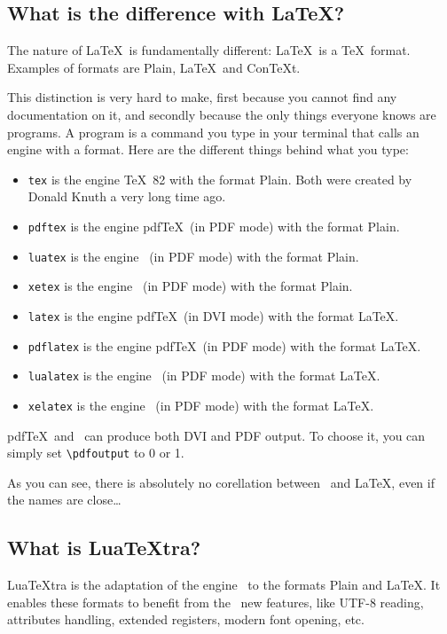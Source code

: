 \documentclass{article}
\newcommand\code{\texttt}
\begin{document}
\subsection{What is the difference with \LaTeX ?}

The nature of \LaTeX\ is fundamentally different: \LaTeX\ is a \TeX\ format.
Examples of formats are Plain, \LaTeX\ and Con\TeX t.

This distinction is very hard to make, first because you cannot find any
documentation on it, and secondly because the only things everyone knows are
programs. A program is a command you type in your terminal that calls an
engine with a format. Here are the different things behind what you type:

\begin{itemize}
  \item \code{tex} is the engine \TeX\ 82 with the format Plain. Both were
    created by Donald Knuth a very long time ago.
  \item \code{pdftex} is the engine pdf\TeX\ (in PDF mode) with the format
    Plain.
  \item \code{luatex} is the engine \LuaTeX\ (in PDF mode) with the format
    Plain.
  \item \code{xetex} is the engine \XeTeX\ (in PDF mode) with the format
    Plain.
  \item \code{latex} is the engine pdf\TeX\ (in DVI mode) with the format
    \LaTeX .
  \item \code{pdflatex} is the engine pdf\TeX\ (in PDF mode) with the format
    \LaTeX .
  \item \code{lualatex} is the engine \LuaTeX\ (in PDF mode) with the format
    \LaTeX .
  \item \code{xelatex} is the engine \XeTeX\ (in PDF mode) with the format
    \LaTeX .
\end{itemize}

pdf\TeX\ and \LuaTeX\ can produce both DVI and PDF output. To choose it, you
can simply set \verb+\pdfoutput+ to 0 or 1.

As you can see, there is absolutely no corellation between \LuaTeX\ and
\LaTeX, even if the names are close\dots

\subsection{What is Lua\TeX tra?\label{sub:luatextra}}

Lua\TeX tra is the adaptation of the engine \LuaTeX\ to the formats Plain and
\LaTeX . It enables these formats to benefit from the \LuaTeX\ new features,
like UTF-8 reading, attributes handling, extended registers, modern font
opening, etc.
\end{document}
